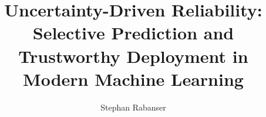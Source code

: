 \documentclass{ut-thesis}
\author{Stephan Rabanser}
\title{Uncertainty-Driven Reliability: Selective Prediction and Trustworthy Deployment in Modern Machine Learning}
\begin{document}
  \frontmatter
    \maketitle
    \begin{abstract}
      
    \end{abstract}
    \begin{acknowledgements}
      
    \end{acknowledgements}
    \tableofcontents
    \listoftables
    \listoffigures
  \mainmatter
    
    
    
    
    
    
    
  \appendix
    
    
    
    
  \backmatter
  

  
\end{document}
